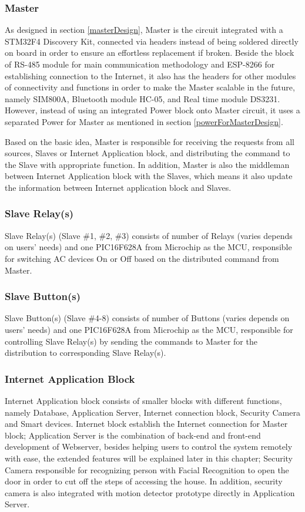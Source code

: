     \subsubsection{Master}
    As designed in section \ref{masterDesign}, Master is the circuit integrated with a STM32F4 Discovery Kit, connected via headers instead of being soldered directly on board in order to ensure an effortless replacement if broken. Beside the block of RS-485 module for main communication methodology and ESP-8266 for establishing connection to the Internet, it also has the headers for other modules of connectivity and functions in order to make the Master scalable in the future, namely SIM800A, Bluetooth module HC-05, and Real time module DS3231. However, instead of using an integrated Power block onto Master circuit, it uses a separated Power for Master as mentioned in section \ref{powerForMasterDesign}.

    Based on the basic idea, Master is responsible for receiving the requests from all sources, Slaves or Internet Application block, and distributing the command to the Slave with appropriate function. In addition, Master is also the middleman between Internet Application block with the Slaves, which means it also update the information between Internet application block and Slaves.
    \subsubsection{Slave Relay(s)}
    Slave Relay(s) (Slave \#1, \#2, \#3) consists of number of Relays (varies depends on users’ needs) and one PIC16F628A from Microchip as the MCU, responsible for switching AC devices On or Off based on the distributed command from Master.
    \subsubsection{Slave Button(s)}
    Slave Button(s) (Slave \#4-8) consists of number of Buttons (varies depends on users’ needs) and one PIC16F628A from Microchip as the MCU, responsible for controlling Slave Relay(s) by sending the commands to Master for the distribution to corresponding Slave Relay(s).
    \subsubsection{Internet Application Block}
    Internet Application block consists of smaller blocks with different functions, namely Database, Application Server, Internet connection block, Security Camera and Smart devices. Internet block establish the Internet connection for Master block; Application Server is the combination of back-end and front-end development of Webserver, besides helping users to control the system remotely with ease, the extended features will be explained later in this chapter; Security Camera responsible for recognizing person with Facial Recognition to open the door in order to cut off the steps of accessing the house. In addition, security camera is also integrated with motion detector prototype directly in Application Server.
